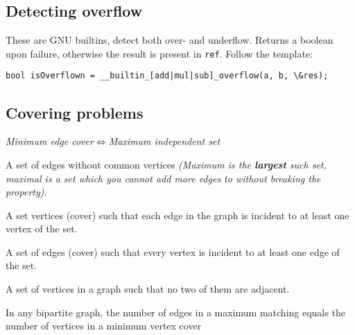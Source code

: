 \documentclass{article}
\begin{document}
\subsection{Detecting overflow}
These are GNU builtins, detect both over- and underflow. Returns a boolean upon failure, otherwise the result is present in \texttt{ref}. Follow the template:

\begin{lstlisting}
bool isOverflown = __builtin_[add|mul|sub]_overflow(a, b, \&res);
\end{lstlisting}

\subsection{Covering problems}

\begin{center}
	\emph{Minimum edge cover$\iff$Maximum independent set}
\end{center}

\begin{description}
	\setlength\itemsep{-.25em}
	\item[Matching]
		A set of edges without common vertices \textit{(Maximum is the \textbf{largest} such set, maximal is a set which you cannot add more edges to without breaking the property)}.
	\item[Minimum Vertex Cover]
		A set vertices (cover) such that each edge in the graph is incident to at least one vertex of the set.
	\item[Minimum Edge Cover]
		A set of edges (cover) such that every vertex is incident to at least one edge of the set.
	\item[Maximum Independent Set]
		A set of vertices in a graph such that no two of them are adjacent.
	\item[K\"{o}nig's theorem]
		In any bipartite graph, the number of edges in a maximum matching equals the number of vertices in a minimum vertex cover
\end{description}
\end{document}
